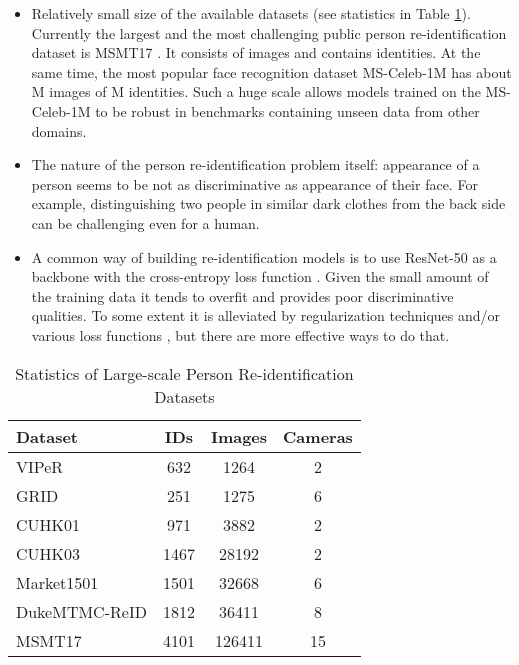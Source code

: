 \documentclass[a4paper,conference]{IEEEtran}
\begin{document}
\begin{itemize}
  \item Relatively small size of the available datasets (see statistics in Table
    \ref{tab:data}). Currently the largest and the most challenging public
    person re-identification dataset is MSMT17 \cite{MSMT17}. It consists of
     images and contains  identities. At the same time, the most
    popular face recognition dataset MS-Celeb-1M \cite{ms1m} has about M
    images of M identities. Such a huge scale allows models trained on
    the MS-Celeb-1M to be robust in benchmarks containing unseen data
    \cite{deng2018arcface} from other domains.
  \item The nature of the person re-identification problem itself: appearance of
    a person seems to be not as discriminative as appearance of their face. For
    example, distinguishing two people in similar dark clothes from the back side
    can be challenging even for a human.
  \item A common way of building re-identification models is to use ResNet-50
    \cite{resnet} as a backbone with the cross-entropy loss function
    \cite{baselineCrossDomain, hpm}. Given the small amount of the training data
    it tends to overfit and provides poor discriminative qualities. To some
    extent it is alleviated by regularization techniques and/or various loss
    functions \cite{mgn, abd, lmSoftmax, centerLoss}, but there are more
    effective ways to do that.
\end{itemize}

\begin{table}
  \caption{Statistics of Large-scale Person Re-identification Datasets}
  \label{tab:data}
  \centering
  \begin{tabular}{l|c|c|c}
    Dataset & IDs & Images & Cameras \\ \hline
    VIPeR \cite{Gray2007EvaluatingAM} & 632 & 1264 & 2 \\
    GRID \cite{Loy2009MulticameraAC} & 251 & 1275 & 6 \\
    CUHK01 \cite{cuhk01} & 971 & 3882 & 2 \\
    CUHK03 \cite{firstCNNReid} & 1467 & 28192 & 2 \\
    \hline
    Market1501 \cite{market} & 1501 & 32668 & 6 \\
    DukeMTMC-ReID \cite{duke, duke2} & 1812 & 36411 & 8 \\
    MSMT17 \cite{MSMT17} & 4101 & 126411 & 15 \\
    \hline
  \end{tabular}
\end{table}
\end{document}
